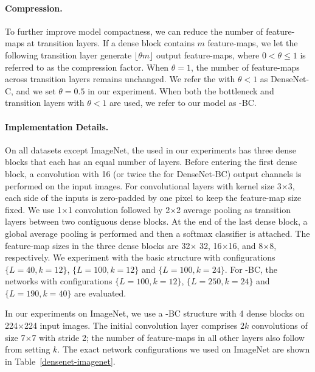 \vspace{-2 ex}
\paragraph{Compression.}
To further improve model compactness, we can reduce the number of feature-maps at transition layers. If a dense block contains $m$ feature-maps, we let the following transition layer generate $\lfloor \theta m\rfloor$ output feature-maps, where $0<\!\theta\le \!1$ is referred to as the compression factor. When $\theta\!=\!1$, the number of feature-maps across transition layers remains unchanged. We refer the \methodnameshort{} with $\theta\!<\!1$ as DenseNet-C, and we set $\theta=0.5$ in our experiment. When both the bottleneck and transition layers with $\theta\!<1$ are used, we refer to our model as \methodnameshort{}-BC.

\vspace{-2 ex}
\paragraph{Implementation Details.}
On all datasets except ImageNet, the \methodnameshort{} used in our experiments has three dense blocks that each has an equal number of layers. Before entering the first dense block, a convolution with 16 (or twice the \stepsizename{} for DenseNet-BC) output channels is performed on the input images. For convolutional layers with kernel size 3$\times$3, each side of the inputs is zero-padded by one pixel to keep the feature-map size fixed. We use 1$\times$1 convolution followed by 2$\times$2 average pooling as transition layers between two contiguous dense blocks. At the end of the last dense block, a global average pooling is performed and then a softmax classifier is attached. The feature-map sizes in the three dense blocks are 32$\times$ 32, 16$\times$16, and 8$\times$8, respectively. We experiment with the basic \methodnameshort{} structure with configurations $\{L\!=\!40, k\!=\!12\}$, $\{L\!=\!100,k\!=\!12\}$ and $\{L\!=\!100,k\!=\!24\}$. For \methodnameshort{}-BC, the networks with configurations $\{L\!=\!100, k\!=\!12\}$, $\{L\!=\!250,k\!=\!24\}$ and $\{L\!=\!190,k\!=\!40\}$ are evaluated.

In our experiments on ImageNet, we use a \methodnameshort{}-BC structure with 4 dense blocks on 224$\times$224 input images. The initial convolution layer comprises $2k$ convolutions of size 7$\times$7 with stride 2; the number of feature-maps in all other layers also follow from setting $k$. The exact network configurations we used on ImageNet are shown in Table~\ref{densenet-imagenet}.



